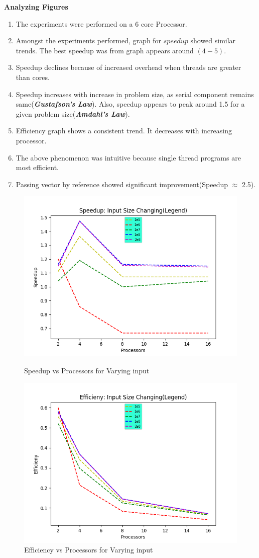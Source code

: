 \documentclass{article}
\newcommand{\bld}[1]{\textbf{#1}}
\newcommand{\italb}[1]{\textbf{\textit{{#1}}}}
\begin{document}
\bld{Analyzing Figures}
\begin{enumerate}
	\item The experiments were performed on a 6 core Processor.
	\item Amongst the experiments performed, graph for $speedup$ showed similar trends. The best speedup was from graph appears around $(4-5)$.
	\item Speedup declines because of increased overhead when threads are greater than cores.
	\item Speedup increases with increase in problem size, as serial component remains same(\italb{Gustafson's Law}). Also, speedup appears to peak around 1.5 for a given problem size(\italb{Amdahl's Law}).
	\item Efficiency graph shows a consistent trend. It decreases with increasing processor.
	\item The above phenomenon was intuitive because single thread programs are most efficient.
	\item Passing vector by reference showed significant improvement(Speedup $\approx$ 2.5).
\end{enumerate}
\begin{figure}[h]
\vspace*{-2cm}
\centering
\includegraphics[scale=0.9]{Part1S.png}
\caption{Speedup vs Processors for Varying input}
\includegraphics[scale=0.9]{Part1E.png}
\caption{Efficiency vs Processors for Varying input}
\end{figure}
\end{document}
